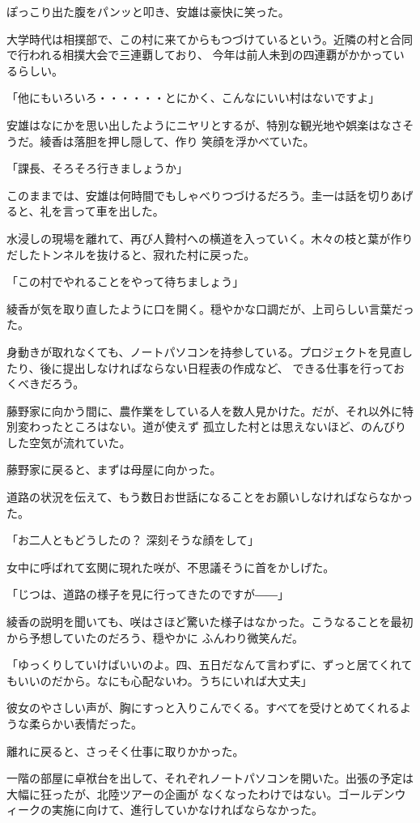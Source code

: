 ﻿\documentclass[book,tate]{jlreq}
\begin{document}
ぽっこり出た腹をパンッと叩き、安雄は豪快に笑った。

大学時代は相撲部で、この村に来てからもつづけているという。近隣の村と合同で行われる相撲大会で三連覇しており、 今年は前人未到の四連覇がかかっているらしい。

「他にもいろいろ・・・・・・とにかく、こんなにいい村はないですよ」

安雄はなにかを思い出したようにニヤリとするが、特別な観光地や娯楽はなさそうだ。綾香は落胆を押し隠して、作り 笑顔を浮かべていた。

「課長、そろそろ行きましょうか」

このままでは、安雄は何時間でもしゃべりつづけるだろう。圭一は話を切りあげると、礼を言って車を出した。

水浸しの現場を離れて、再び人贄村への横道を入っていく。木々の枝と葉が作りだしたトンネルを抜けると、寂れた村に戻った。

「この村でやれることをやって待ちましょう」

綾香が気を取り直したように口を開く。穏やかな口調だが、上司らしい言葉だった。

身動きが取れなくても、ノートパソコンを持参している。プロジェクトを見直したり、後に提出しなければならない日程表の作成など、 できる仕事を行っておくべきだろう。

藤野家に向かう間に、農作業をしている人を数人見かけた。だが、それ以外に特別変わったところはない。道が使えず 孤立した村とは思えないほど、のんびりした空気が流れていた。

藤野家に戻ると、まずは母屋に向かった。

道路の状況を伝えて、もう数日お世話になることをお願いしなければならなかった。

「お二人ともどうしたの？ 深刻そうな顔をして」

女中に呼ばれて玄関に現れた咲が、不思議そうに首をかしげた。

「じつは、道路の様子を見に行ってきたのですが――」

綾香の説明を聞いても、咲はさほど驚いた様子はなかった。こうなることを最初から予想していたのだろう、穏やかに ふんわり微笑んだ。

「ゆっくりしていけばいいのよ。四、五日だなんて言わずに、ずっと居てくれてもいいのだから。なにも心配ないわ。うちにいれば大丈夫」

彼女のやさしい声が、胸にすっと入りこんでくる。すべてを受けとめてくれるような柔らかい表情だった。

離れに戻ると、さっそく仕事に取りかかった。

一階の部屋に卓袱台を出して、それぞれノートパソコンを開いた。出張の予定は大幅に狂ったが、北陸ツアーの企画が なくなったわけではない。ゴールデンウィークの実施に向けて、進行していかなければならなかった。
\end{document}
